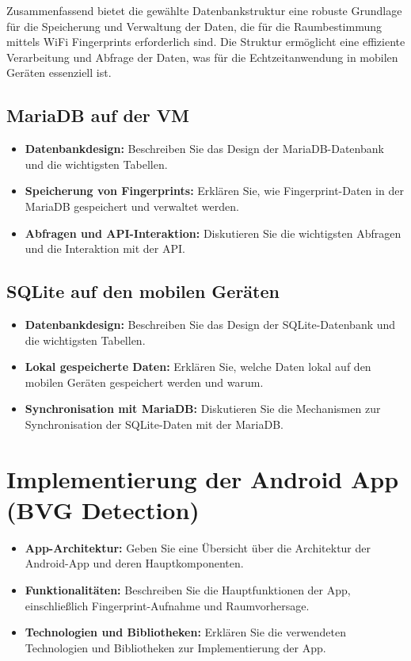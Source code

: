 Zusammenfassend bietet die gewählte Datenbankstruktur eine robuste Grundlage für die Speicherung und Verwaltung der Daten, die für die Raumbestimmung mittels WiFi Fingerprints erforderlich sind. Die Struktur ermöglicht eine effiziente Verarbeitung und Abfrage der Daten, was für die Echtzeitanwendung in mobilen Geräten essenziell ist.

\subsection{MariaDB auf der VM}
\begin{itemize}
    \item \textbf{Datenbankdesign:} Beschreiben Sie das Design der MariaDB-Datenbank und die wichtigsten Tabellen.
    \item \textbf{Speicherung von Fingerprints:} Erklären Sie, wie Fingerprint-Daten in der MariaDB gespeichert und verwaltet werden.
    \item \textbf{Abfragen und API-Interaktion:} Diskutieren Sie die wichtigsten Abfragen und die Interaktion mit der API.
\end{itemize}

\subsection{SQLite auf den mobilen Geräten}
\begin{itemize}
    \item \textbf{Datenbankdesign:} Beschreiben Sie das Design der SQLite-Datenbank und die wichtigsten Tabellen.
    \item \textbf{Lokal gespeicherte Daten:} Erklären Sie, welche Daten lokal auf den mobilen Geräten gespeichert werden und warum.
    \item \textbf{Synchronisation mit MariaDB:} Diskutieren Sie die Mechanismen zur Synchronisation der SQLite-Daten mit der MariaDB.
\end{itemize}

\section{Implementierung der Android App (BVG Detection)}
\begin{itemize}
    \item \textbf{App-Architektur:} Geben Sie eine Übersicht über die Architektur der Android-App und deren Hauptkomponenten.
    \item \textbf{Funktionalitäten:} Beschreiben Sie die Hauptfunktionen der App, einschließlich Fingerprint-Aufnahme und Raumvorhersage.
    \item \textbf{Technologien und Bibliotheken:} Erklären Sie die verwendeten Technologien und Bibliotheken zur Implementierung der App.
\end{itemize}

